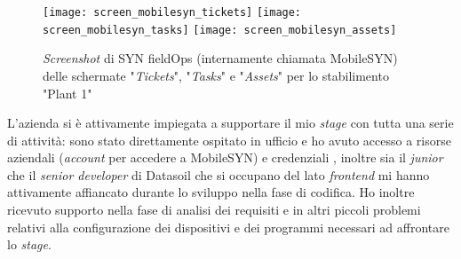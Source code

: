 \begin{figure}[H]
    \centering
    \texttt{[image: screen\_mobilesyn\_tickets]}\hfill
    \texttt{[image: screen\_mobilesyn\_tasks]}\hfill
    \texttt{[image: screen\_mobilesyn\_assets]}
    \caption{\textit{Screenshot} di SYN fieldOps (internamente chiamata MobileSYN) delle schermate "\textit{Tickets}", "\textit{Tasks}" e "\textit{Assets}" per lo stabilimento "Plant 1"}
\end{figure}
L'azienda si è attivamente impiegata a supportare il mio \textit{stage} con tutta una serie di attività: sono stato direttamente ospitato in ufficio e ho avuto accesso a risorse aziendali (\textit{account} \aws{} per accedere a MobileSYN) e credenziali \asa{}, inoltre sia il \textit{junior} che il \textit{senior developer} di Datasoil che si occupano del lato \textit{frontend} mi hanno attivamente affiancato durante lo sviluppo nella fase di codifica. Ho inoltre ricevuto supporto nella fase di analisi dei requisiti e in altri piccoli problemi relativi alla configurazione dei dispositivi e dei programmi necessari ad affrontare lo \textit{stage}.

